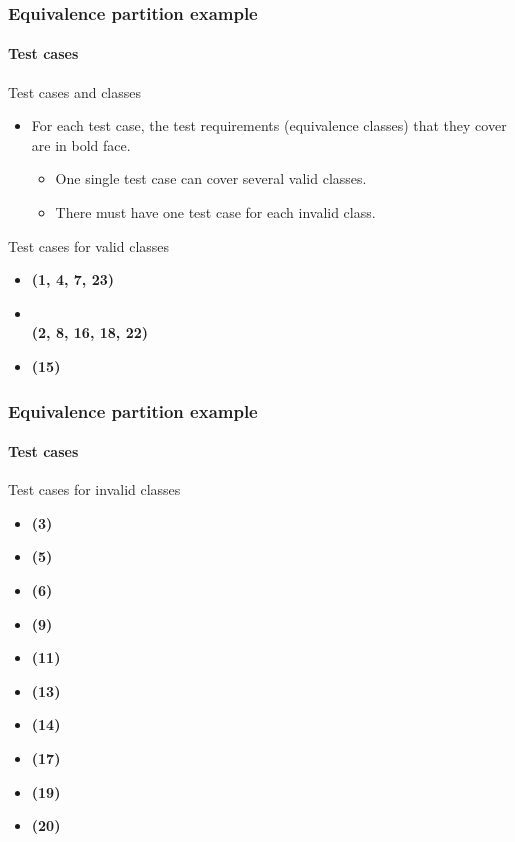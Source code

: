 \begin{frame}
\frametitle{Equivalence partition example}
\framesubtitle{Test cases}

\begin{block}{Test cases and classes}
\begin{itemize}
	\item For each test case, the test requirements (equivalence classes) that
	they cover are in bold face.
	\begin{itemize}
		\item One single test case can cover several valid classes.

		\item There must have one test case for each invalid class.
	\end{itemize}
\end{itemize}
\end{block}


\begin{block}{Test cases for valid classes}
\begin{itemize}
	\item {} \textbf{(1, 4, 7, 23)}
	\item {}\\ \textbf{(2, 8, 16, 18, 22)}
	\item {} \textbf{(15)}
\end{itemize}
\end{block}
\end{frame}


\begin{frame}[hasprev=true, hasnext=false]
\frametitle{Equivalence partition example}
\framesubtitle{Test cases}

\begin{block}{Test cases for invalid classes}
\begin{itemize}
	\item {} \textbf{(3)}
	\item {} \textbf{(5)}
	\item {} \textbf{(6)}
	\item {} \textbf{(9)}
	\item {} \textbf{(11)}
	\item {} \textbf{(13)}
	\item {} \textbf{(14)}
	\item {} \textbf{(17)}
	\item {} \textbf{(19)}
	\item {} \textbf{(20)}

\end{itemize}
\end{block}
\end{frame}